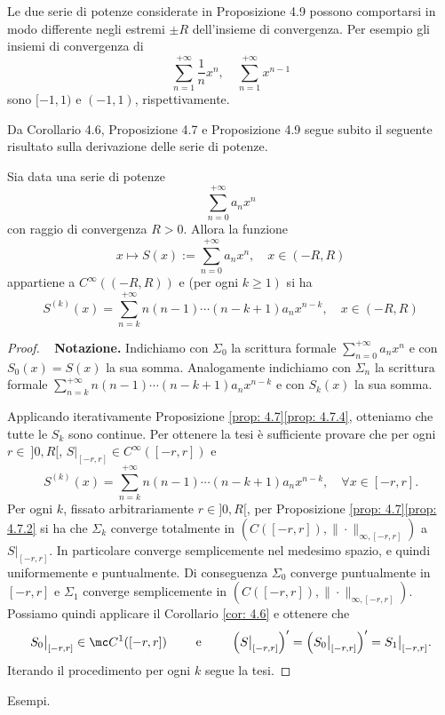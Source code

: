 \begin{oss}    
    Le due serie di potenze considerate in Proposizione 4.9 possono comportarsi in modo differente negli estremi $\pm R$ dell'insieme di convergenza. Per esempio gli insiemi di convergenza di
    \[\sum_{n=1}^{+\infty} \frac{1}{n} x^{n}, \quad \sum_{n=1}^{+\infty} x^{n-1}\]
    sono $[-1,1)$ e $(-1,1)$, rispettivamente.
\end{oss}

Da Corollario 4.6, Proposizione 4.7 e Proposizione 4.9 segue subito il seguente risultato sulla derivazione delle serie di potenze.
\begin{proposition}[$**$] \label{prop: 4.10}
    Sia data una serie di potenze
    \[\sum_{n=0}^{+\infty} a_{n} x^{n}\]
    con raggio di convergenza $R>0$. Allora la funzione
    \[x \mapsto S(x):=\sum_{n=0}^{+\infty} a_{n} x^{n}, \quad x \in(-R, R)\]
    appartiene a $C^{\infty}((-R, R))$ e (per ogni $\left.k \geq 1\right)$ si ha
    \[S^{(k)}(x)=\sum_{n=k}^{+\infty} n(n-1) \cdots(n-k+1) a_{n} x^{n-k}, \quad x \in(-R, R)\]
\end{proposition}
\begin{proof}~
    \textbf{Notazione.} Indichiamo con $\Sigma_0$ la scrittura formale $\sum_{n=0}^{+\infty}a_nx^n$ e con $S_0(x) = S(x)$ la sua somma. Analogamente indichiamo con $\Sigma_n$ la scrittura formale $\sum_{n=k}^{+\infty} n(n-1) \cdots(n-k+1) a_{n} x^{n-k}$ e con $S_k(x)$ la sua somma. 
    
    Applicando iterativamente Proposizione \ref{prop: 4.7}\ref{prop: 4.7.4}, otteniamo che tutte le $S_k$ sono continue. Per ottenere la tesi è sufficiente provare che per ogni $r\in \ ]0,R[$, $S\big|_{[-r,r]}\in C^{\infty}([-r,r])$ e 
    \[S^{(k)}(x)=\sum_{n=k}^{+\infty} n(n-1) \cdots(n-k+1) a_{n} x^{n-k}, \quad \forall x \in[-r,r].\]
    Per ogni $k$, fissato arbitrariamente $r\in ]0,R[$, per Proposizione \ref{prop: 4.7}\ref{prop: 4.7.2} si ha che $\Sigma_k$ converge totalmente in $(C([-r,r]), \|\cdot\|_{\infty, [-r,r]})$ a $S\big|_{[-r,r]}$. In particolare converge semplicemente nel medesimo spazio, e quindi uniformemente e puntualmente. Di conseguenza $\Sigma_0$ converge puntualmente in $[-r,r]$ e $\Sigma_1$ converge semplicemente in $(C([-r,r]), \|\cdot\|_{\infty,[-r,r]})$. Possiamo quindi applicare il Corollario \ref{cor: 4.6} e ottenere che
    \[S_0\big|_{[-r,r]} \in \mc C^1([-r,r]) \qquad \text{ e }\qquad \left( S\big|_{[-r,r]} \right)' = \left( S_0\big|_{[-r,r]} \right)' = S_1\big|_{[-r,r]}.\]
    Iterando il procedimento per ogni $k$ segue la tesi.
\end{proof}
Esempi.
